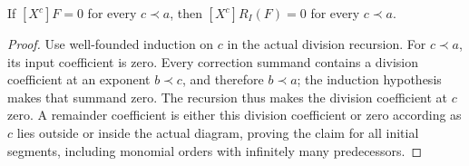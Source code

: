 \begin{lemma}
\label{hir:actual-formal-division-initial-segment}
\leanok
If $[X^c]F=0$ for every $c\prec a$, then $[X^c]R_I(F)=0$ for every
$c\prec a$.
\end{lemma}
\begin{proof}
Use well-founded induction on $c$ in the actual division recursion.
For $c\prec a$, its input coefficient is zero. Every correction summand
contains a division coefficient at an exponent $b\prec c$, and therefore
$b\prec a$; the induction hypothesis makes that summand zero. The
recursion thus makes the division coefficient at $c$ zero. A remainder
coefficient is either this division coefficient or zero according as
$c$ lies outside or inside the actual diagram, proving the claim for all
initial segments, including monomial orders with infinitely many
predecessors.
\end{proof}

